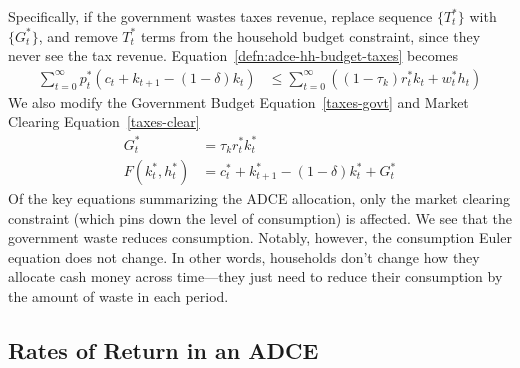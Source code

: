 \documentclass[12pt]{article}
\theoremstyle{plain}
\theoremstyle{definition}
\theoremstyle{remark}
\newcommand{\sumtinfz}{\sum^\infty_{t=0}}
\begin{document}
\begin{enumerate}
    Specifically, if the government wastes taxes revenue, replace
    sequence $\{T^*_t\}$ with $\{G^*_t\}$, and remove $T^*_t$ terms from
    the household budget constraint, since they never see the tax
    revenue.  Equation~\ref{defn:adce-hh-budget-taxes} becomes
    \begin{align*}
        \sumtinfz p^*_t(c_t + k_{t+1}-(1-\delta)k_t) &\leq
        \sumtinfz ((1-\tau_k)r^*_t k_t + w^*_t h_t)
    \end{align*}
    We also modify the Government Budget Equation~\ref{taxes-govt} and
    Market Clearing Equation~\ref{taxes-clear}
    \begin{align*}
      G^*_t &=  \tau_k r^*_t k^*_t \\
      F(k^*_t,h_t^*) &= c_t^* + k^*_{t+1} - (1-\delta)k_t^* + G^*_t
    \end{align*}
    Of the key equations summarizing the ADCE allocation, only the
    market clearing constraint (which pins down the level of
    consumption) is affected. We see that the government waste reduces
    consumption.
    Notably, however, the consumption Euler equation does not change. In
    other words, households don't change how they allocate cash money
    across time---they just need to reduce their consumption by the
    amount of waste in each period.
\end{enumerate}

\clearpage
\subsection{Rates of Return in an ADCE}
\end{document}
